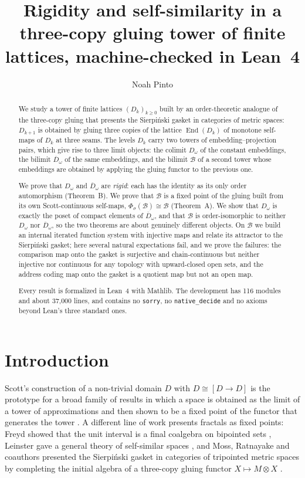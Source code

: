\documentclass[11pt]{amsart}
\title[Rigidity and self-similarity in a gluing tower]{Rigidity and self-similarity in a three-copy gluing tower of finite lattices, machine-checked in Lean~4}
\author{Noah Pinto}
\theoremstyle{plain}
\theoremstyle{definition}
\newcommand{\End}{\operatorname{End}}
\newcommand{\Dc}{D_\omega}
\newcommand{\Db}{\overline{D}_\omega}
\newcommand{\BB}{\mathcal{B}}
\newcommand{\iso}{\cong}
\begin{document}
\begin{abstract}
We study a tower of finite lattices $(D_k)_{k\ge 0}$ built by an order-theoretic
analogue of the three-copy gluing that presents the Sierpi\'nski gasket in
categories of metric spaces: $D_{k+1}$ is obtained by gluing three copies of the
lattice $\End(D_k)$ of monotone self-maps of $D_k$ at three seams. The levels
$D_k$ carry two towers of embedding--projection pairs, which give rise to three
limit objects: the colimit $\Dc$ of the constant embeddings, the bilimit $\Db$
of the same embeddings, and the bilimit $\BB$ of a second tower whose
embeddings are obtained by applying the gluing functor to the previous one.

We prove that $\Dc$ and $\Db$ are \emph{rigid}: each has the identity as its only
order automorphism (Theorem~B). We prove that $\BB$ is a fixed point of the
gluing built from its own Scott-continuous self-maps, $\Phi_\sigma(\BB)\iso\BB$
(Theorem~A). We show that $\Dc$ is exactly the poset of compact elements of
$\Db$, and that $\BB$ is order-isomorphic to neither $\Dc$ nor $\Db$, so the two
theorems are about genuinely different objects. On $\BB$ we build an internal
iterated function system with injective maps and relate its attractor to the
Sierpi\'nski gasket; here several natural expectations fail, and we prove the
failures: the comparison map onto the gasket is surjective and chain-continuous
but neither injective nor continuous for any topology with upward-closed open
sets, and the address coding map onto the gasket is a quotient map but not an
open map.

Every result is formalized in Lean~4 with Mathlib. The development has 116
modules and about 37{,}000 lines, and contains no \texttt{sorry}, no
\texttt{native\_decide} and no axioms beyond Lean's three standard ones.
\end{abstract}

\maketitle

\section{Introduction}\label{sec:intro}

Scott's construction of a non-trivial domain $D$ with $D\iso[D\to D]$
\cite{Scott1972} is the prototype for a broad family of results in which a
space is obtained as the limit of a tower of approximations and then shown to
be a fixed point of the functor that generates the tower
\cite{SmythPlotkin1982,AbramskyJung1994}. A different line of work presents
fractals as fixed points: Freyd showed that the unit interval is a final
coalgebra on bipointed sets \cite{Freyd2008}, Leinster gave a general theory of
self-similar spaces \cite{Leinster2011}, and Moss, Ratnayake and coauthors
presented the Sierpi\'nski gasket in categories of tripointed metric spaces by
completing the initial algebra of a three-copy gluing functor
$X\mapsto M\otimes X$ \cite{MossRatnayakeRose2014,RatnayakeEtAl2024}.
\end{document}
